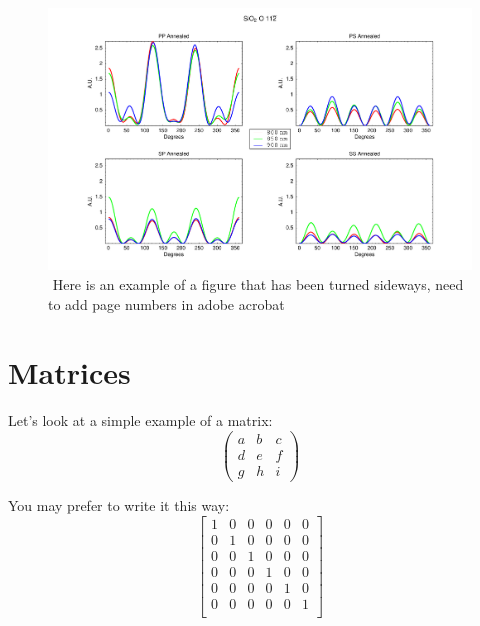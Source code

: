 \newpage
\thispagestyle{empty}
\begin{landscape}
\begin{figure}[hbtp]
\centering
\includegraphics[width=1.3\textwidth]{images/sideways-figure.pdf}
\caption{$ $ Here is an example of a figure that has been turned sideways, need to add page numbers in adobe acrobat}
\label{fig-hist}
\end{figure}
\end{landscape}

\section{Matrices}
Let's look at a simple example of a matrix:
\[ \left( \begin{array}{ccc}
a & b & c \\
d & e & f \\
g & h & i \end{array} \right)\] 


You may prefer to write it this way:
\[ \left[\begin{array} {cccccc}
1 & 0 & 0 & 0 & 0 & 0 \\
0 & 1 & 0 & 0 & 0 & 0 \\
0 & 0 & 1 & 0 & 0 & 0 \\
0 & 0 & 0 & 1 & 0 & 0 \\
0 & 0 & 0 & 0 & 1 & 0 \\
0 & 0 & 0 & 0 & 0 & 1 \\

\end{array} \right] \]

